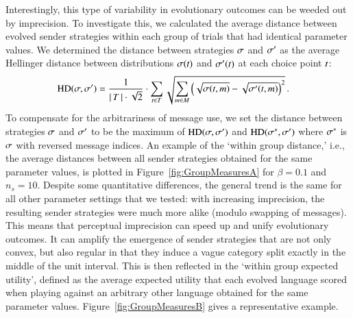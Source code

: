 \documentclass[12pt,english]{article}
\numberwithin{equation}{section}
\begin{document}
Interestingly, this type of variability in evolutionary outcomes can
be weeded out by imprecision. To investigate this, we calculated the average
distance between evolved sender strategies within each group of trials
that had identical parameter values. We determined the distance
between strategies $\sigma$ and $\sigma'$ as the average Hellinger
distance between distributions $\sigma(t)$ and
$\sigma'(t)$ at each choice point $t$:
\begin{align*}
  \text{HD}(\sigma,\sigma') & = \frac{1}{{\left \lvert \, T \, \right\rvert \cdot
     \sqrt{2}}} \cdot  \sum_{t \in T} 
 \sqrt{\sum_{m \in  M}
         \left ( \sqrt{\sigma(t,m)} -
         \sqrt{\sigma'(t,m)} \right )^2 }\,.
\end{align*}
To compensate for the arbitrariness of message use, we set the distance between strategies
$\sigma$ and $\sigma'$ to be the maximum of $\text{HD}(\sigma,\sigma')$ and
$\text{HD}(\sigma^*,\sigma')$ where $\sigma^*$ is $\sigma$ with reversed message
indices. An example of the `within group distance,' i.e., the average distances between
all sender strategies obtained for the same parameter values, is plotted in
Figure~\ref{fig:GroupMeasuresA} for $\beta = 0.1$ and $n_s = 10$. Despite some quantitative
differences, the general trend is the same for all other parameter settings that we tested:
with increasing imprecision, the resulting sender strategies were much more alike (modulo
swapping of messages). This means that perceptual imprecision can speed up and unify
evolutionary outcomes. It can amplify the emergence of sender strategies that are not only
convex, but also regular in that they induce a vague category split exactly in the middle of
the unit interval.
This is then reflected in the `within group expected utility', defined as the average
expected utility that each evolved language scored when playing against an arbitrary other
language obtained for the same parameter values. Figure~\ref{fig:GroupMeasuresB} gives a
representative example.
\end{document}
